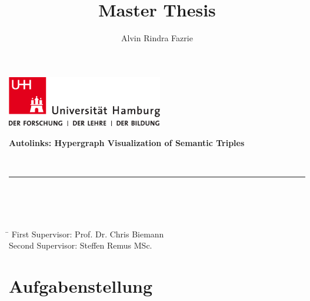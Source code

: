 \documentclass[
    fontsize=12pt,
    headings=small,
    parskip=half,           %
    bibliography=totoc,
    numbers=noenddot,       %
    open=any,               %
    ]{scrreprt}
\title{Master Thesis}
\author{Alvin Rindra Fazrie}
\begin{document}
\begin{titlepage}
\includegraphics[width=6.8cm]{../pic/up-uhh-logo-u-2010-u-farbe-u-rgb.pdf}
  \setcounter{page}{-1}


	\vfill
\begin{center} 
		\vspace{14mm}
		\noindent \textbf{\huge
		  Autolinks: Hypergraph Visualization of Semantic Triples 
		}
		\vspace{60mm}	
	\end{center}
	
	\vfill
	
	 \\
	\noindent \rule{\textwidth}{0.4mm} 
	 \\
	 \\
	 \\
	\begin{tabbing}
	\hspace{8em} \=  \kill
	First Supervisor: \> Prof. Dr. Chris Biemann \\
	Second Supervisor: \> Steffen Remus MSc. \\
	\end{tabbing}
\end{titlepage}


\chapter*{Aufgabenstellung}
\end{document}
